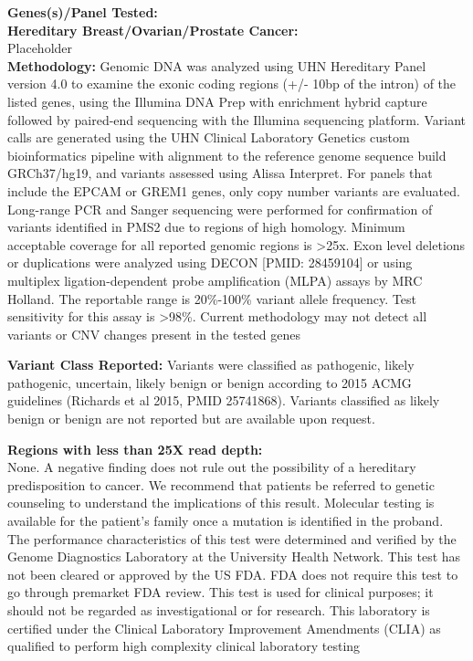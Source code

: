 \documentclass[9pt]{extarticle}
\begin{document}
\begin{flushleft}
{\bf
Genes(s)/Panel Tested:\\
Hereditary Breast/Ovarian/Prostate Cancer: \\}
Placeholder \\
{\bf Methodology: } Genomic DNA was analyzed using UHN Hereditary Panel version 4.0 to examine the exonic coding regions (+/- 10bp of the intron) of the listed genes, using the Illumina DNA Prep with enrichment hybrid capture followed by paired-end sequencing with the Illumina sequencing platform. Variant calls are generated using the UHN Clinical Laboratory Genetics custom bioinformatics pipeline with alignment to the reference genome sequence build GRCh37/hg19, and variants assessed using Alissa Interpret. For panels that include the EPCAM or GREM1 genes, only copy number variants are evaluated. Long-range PCR and Sanger sequencing were performed for confirmation of variants identified in PMS2 due to regions of high homology. Minimum acceptable coverage for all reported genomic regions is >25x. Exon level deletions or duplications were analyzed using DECON [PMID: 28459104] or using multiplex ligation-dependent probe amplification (MLPA) assays by MRC Holland. The reportable range is 20\%-100\% variant allele frequency. Test sensitivity for this assay is >98\%. Current methodology may not detect all variants or CNV changes present in the tested genes

{\bf Variant Class Reported: } Variants were classified as pathogenic, likely pathogenic, uncertain, likely benign or benign according to 2015 ACMG guidelines (Richards et al 2015, PMID 25741868). Variants classified as likely benign or benign are not reported but are available upon request. 

{\bf Regions with less than 25X read depth: \\}
None. 
\newline
\newline
A negative finding does not rule out the possibility of a hereditary predisposition to cancer. We recommend that patients be referred to genetic counseling to understand the implications of this result. Molecular testing is available for the patient's family once a mutation is identified in the proband. 
\newline
\newline
The performance characteristics of this test were determined and verified by the Genome Diagnostics Laboratory at the University Health Network. This test has not been cleared or approved by the US FDA. FDA does not require this test to go through premarket FDA review. This test is used for clinical purposes; it should not be regarded as investigational or for research. This laboratory is certified under the Clinical Laboratory Improvement Amendments (CLIA) as qualified to perform high complexity clinical laboratory testing
\end{flushleft}
\end{document}
